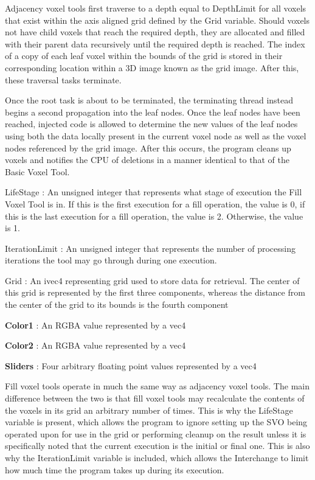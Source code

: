 \documentclass[onecolumn, draftclsnofoot,10pt, compsoc]{IEEEtran}
\newcounter{threesection}[subsubsection]
\newcounter{foursection}[threesection]
\begin{document}
Adjacency voxel tools first traverse to a depth equal to DepthLimit for all voxels that exist within the axis aligned grid defined by the Grid variable. Should voxels not have child voxels that reach the required depth, they are allocated and filled with their parent data recursively until the required depth is reached. The index of a copy of each leaf voxel within the bounds of the grid is stored in their corresponding location within a 3D image known as the grid image. After this, these traversal tasks terminate.

Once the root task is about to be terminated, the terminating thread instead begins a second propagation into the leaf nodes. Once the leaf nodes have been reached, injected code is allowed to determine the new values of the leaf nodes using both the data locally present in the current voxel node as well as the voxel nodes referenced by the grid image. After this occurs, the program cleans up voxels and notifies the CPU of deletions in a manner identical to that of the Basic Voxel Tool.





LifeStage : An unsigned integer that represents what stage of execution the Fill Voxel Tool is in. If this is the first execution for a fill operation, the value is 0, if this is the last execution for a fill operation, the value is 2. Otherwise, the value is 1.

IterationLimit : An unsigned integer that represents the number of processing iterations the tool may go through during one execution.

Grid : An ivec4 representing grid used to store data for retrieval. The center of this grid is represented by the first three components, whereas the distance from the center of the grid to its bounds is the fourth component

\noindent \textbf{Color1} : An RGBA value represented by a vec4

\noindent \textbf{Color2} : An RGBA value represented by a vec4

\noindent \textbf{Sliders} : Four arbitrary floating point values represented by a vec4



Fill voxel tools operate in much the same way as adjacency voxel tools. The main difference between the two is that fill voxel tools may recalculate the contents of the voxels in its grid an arbitrary number of times. This is why the LifeStage variable is present, which allows the program to ignore setting up the SVO being operated upon for use in the grid or performing cleanup on the result unless it is specifically noted that the current execution is the initial or final one. This is also why the IterationLimit variable is included, which allows the Interchange to limit how much time the program takes up during its execution.
\end{document}

